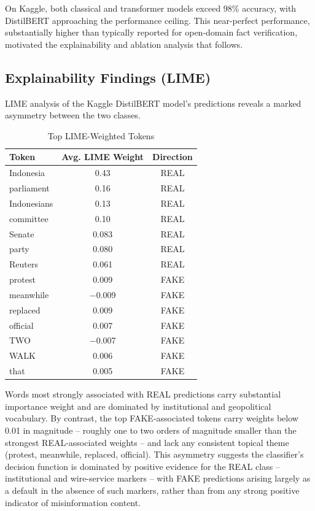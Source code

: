 \documentclass[conference]{IEEEtran}
\begin{document}
On Kaggle, both classical and transformer models exceed 98\% accuracy, with DistilBERT approaching the performance ceiling. This near-perfect performance, substantially higher than typically reported for open-domain fact verification, motivated the explainability and ablation analysis that follows.

\subsection{Explainability Findings (LIME)}
LIME analysis of the Kaggle DistilBERT model's predictions reveals a marked asymmetry between the two classes.

\begin{table}[!t]
\caption{Top LIME-Weighted Tokens}
\centering
\begin{tabular}{lcc}
\toprule
Token & Avg. LIME Weight & Direction \\
\midrule
Indonesia & 0.43 & REAL \\
parliament & 0.16 & REAL \\
Indonesians & 0.13 & REAL \\
committee & 0.10 & REAL \\
Senate & 0.083 & REAL \\
party & 0.080 & REAL \\
Reuters & 0.061 & REAL \\
protest & 0.009 & FAKE \\
meanwhile & $-$0.009 & FAKE \\
replaced & 0.009 & FAKE \\
official & 0.007 & FAKE \\
TWO & $-$0.007 & FAKE \\
WALK & 0.006 & FAKE \\
that & 0.005 & FAKE \\
\bottomrule
\end{tabular}
\end{table}

Words most strongly associated with REAL predictions carry substantial importance weight and are dominated by institutional and geopolitical vocabulary. By contrast, the top FAKE-associated tokens carry weights below 0.01 in magnitude -- roughly one to two orders of magnitude smaller than the strongest REAL-associated weights -- and lack any consistent topical theme (protest, meanwhile, replaced, official). This asymmetry suggests the classifier's decision function is dominated by positive evidence for the REAL class -- institutional and wire-service markers -- with FAKE predictions arising largely as a default in the absence of such markers, rather than from any strong positive indicator of misinformation content.
\end{document}
